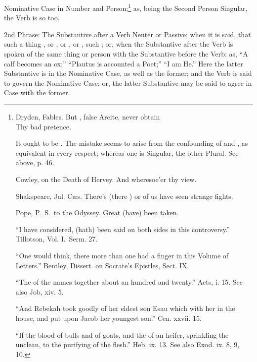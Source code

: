 Nominative Case in Number and Person;\footnote{
  \begin{aquote}{Dryden, Fables.}
    But , false Arcite, never  obtain\\
    Thy bad pretence.
  \end{aquote}

  It ought to be . The mistake seems to arise from the
  confounding of  and , as equivalent in every respect;
  whereas one is Singular, the other Plural. See above, p. 46.

  \begin{aquote}{Cowley, on the Death of Hervey.}
    And wheresoe'er  thy view.
  \end{aquote}

  \begin{aquote}{Shakspeare, Jul. C\ae{}s.}
    There's (there )  or  of us have seen
    strange fights.
  \end{aquote}

  \begin{aquote}{Pope, P.\ S.\ to the Odyssey.}
    Great  (have) been taken.
  \end{aquote}

  ``I have considered,  (hath) been said on both sides in
  this controversy.'' Tillotson, Vol. I.\ Serm. 27.

  ``One would think, there  more  than one had a
  finger in this Volume of Letters.'' Bentley, Dissert. on Socrate's
  Epistles, Sect. IX.

  ``The  of the names together  about an hundred and
  twenty.'' Acts, i. 15. See also Job, xiv. 5.

  ``And Rebekah took goodly  of her eldest son Esau which
   with her in the house, and put  upon Jacob her
  youngest son.'' Cen. xxvii. 15.

  ``If the blood of bulls and of goats, and the  of an heifer,
  sprinkling the unclean,  to the purifying of the
  flesh.'' Heb. ix. 13. See also Exod. ix. 8, 9, 10.} as, 
being the Second Person Singular, the Verb  is so too.

2nd Phrase: The Substantive after a Verb Neuter or Passive; when it is
said, that such a thing , or , or , or
, such ; or, when the Substantive after the
Verb is spoken of the same thing or person with the Substantive before
the Verb: as, ``A calf becomes an ox;'' ``Plautus is accounted a Poet;''
``I am He.'' Here the latter Substantive is in the Nominative Case, as
well as the former; and the Verb is said to govern the Nominative Case:
or, the latter Substantive may be said to agree in Case with the former.

